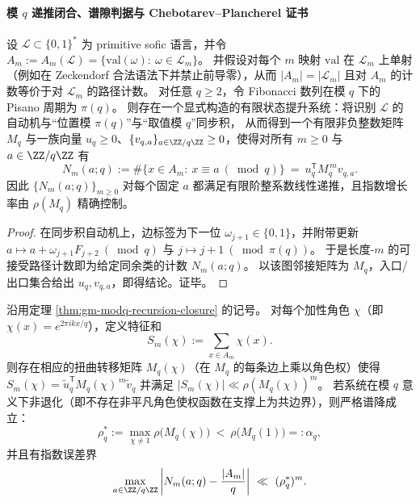\paragraph{模 \texorpdfstring{$q$}{q} 递推闭合、谱隙判据与 Chebotarev--Plancherel 证书}
\begin{theorem}\label{thm:gm-modq-recursion-closure}
设 \(\mathcal{L}\subset\{0,1\}^\ast\) 为 primitive sofic 语言，并令
\(
A_m:=A_m(\mathcal{L})=\{\mathrm{val}(\omega):\ \omega\in\mathcal{L}_m\}
\)。
并假设对每个 \(m\) 映射 \(\mathrm{val}\) 在 \(\mathcal{L}_m\) 上单射（例如在 Zeckendorf 合法语法下并禁止前导零），从而 \(|A_m|=|\mathcal{L}_m|\) 且对 \(A_m\) 的计数等价于对 \(\mathcal{L}_m\) 的路径计数。
对任意 \(q\ge 2\)，令 Fibonacci 数列在模 \(q\) 下的 Pisano 周期为 \(\pi(q)\)。
则存在一个显式构造的有限状态提升系统：将识别 \(\mathcal{L}\) 的自动机与“位置模 \(\pi(q)\)”与“取值模 \(q\)”同步积，
从而得到一个有限非负整数矩阵 \(M_q\) 与一族向量 \(u_q\ge 0\)、\(\{v_{q,a}\}_{a\in\ZZ/q\ZZ}\ge 0\)，使得对所有 \(m\ge 0\) 与 \(a\in\ZZ/q\ZZ\) 有
\[
N_m(a;q):=\#\{x\in A_m:\ x\equiv a\ (\bmod q)\}
\ =\ u_q^{\mathsf T}M_q^{\,m}v_{q,a}.
\]
因此 \(\{N_m(a;q)\}_{m\ge 0}\) 对每个固定 \(a\) 都满足有限阶整系数线性递推，且指数增长率由 \(\rho(M_q)\) 精确控制。
\end{theorem}

\begin{proof}
在同步积自动机上，边标签为下一位 \(\omega_{j+1}\in\{0,1\}\)，并附带更新
\(
a\mapsto a+\omega_{j+1}F_{j+2}\ (\bmod q)
\)
与
\(
j\mapsto j+1\ (\bmod \pi(q))
\)。
于是长度-\(m\) 的可接受路径计数即为给定同余类的计数 \(N_m(a;q)\)。
以该图邻接矩阵为 \(M_q\)，入口/出口集合给出 \(u_q,v_{q,a}\)，即得结论。证毕。
\end{proof}

\begin{theorem}\label{thm:gm-modq-equidistribution-spectral-gap}
沿用定理 \ref{thm:gm-modq-recursion-closure} 的记号。
对每个加性角色 \(\chi\)（即 \(\chi(x)=e^{2\pi i kx/q}\)），定义特征和
\[
S_m(\chi):=\sum_{x\in A_m}\chi(x).
\]
则存在相应的扭曲转移矩阵 \(M_q(\chi)\)（在 \(M_q\) 的每条边上乘以角色权）使得
\(
S_m(\chi)=\tilde u_q^{\mathsf T}M_q(\chi)^{\,m}\tilde v_q
\)
并满足
\(
|S_m(\chi)|\ll \rho(M_q(\chi))^m
\)。
若系统在模 \(q\) 意义下非退化（即不存在非平凡角色使权函数在支撑上为共边界），则严格谱降成立：
\[
\rho_q^\ast:=\max_{\chi\ne 1}\rho\!\bigl(M_q(\chi)\bigr)\ <\ \rho\!\bigl(M_q(1)\bigr)=:\alpha_q,
\]
并且有指数误差界
\[
\max_{a\in\ZZ/q\ZZ}\left|N_m(a;q)-\frac{|A_m|}{q}\right|
\ \ll\ (\rho_q^\ast)^{m}.
\]
\end{theorem}

